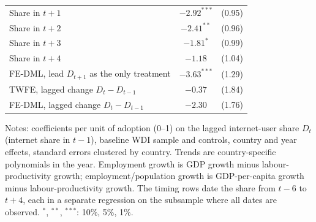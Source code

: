 \documentclass[preprint,12pt,authoryear]{elsarticle}
\begin{document}
\begin{table}[!ht]
\begin{threeparttable}
\begin{tabular}{lcc}
\quad Share in $t+1$ & $-2.92^{***}$ & (0.95)\\
\quad Share in $t+2$ & $-2.41^{**}$ & (0.96)\\
\quad Share in $t+3$ & $-1.81^{*}$ & (0.99)\\
\quad Share in $t+4$ & $-1.18$ & (1.04)\\
\addlinespace
FE-DML, lead $D_{t+1}$ as the only treatment & $-3.63^{***}$ & (1.29)\\
TWFE, lagged change $D_t-D_{t-1}$ & $-0.37$ & (1.84)\\
FE-DML, lagged change $D_t-D_{t-1}$ & $-2.30$ & (1.76)\\
\bottomrule
\end{tabular}
\begin{tablenotes}\scriptsize
\item Notes: coefficients per unit of adoption (0--1) on the lagged internet-user share $D_t$ (internet share in $t-1$), baseline WDI sample and controls, country and year effects, standard errors clustered by country. Trends are country-specific polynomials in the year. Employment growth is GDP growth minus labour-productivity growth; employment/population growth is GDP-per-capita growth minus labour-productivity growth. The timing rows date the share from $t-6$ to $t+4$, each in a separate regression on the subsample where all dates are observed. $^{*}$, $^{**}$, $^{***}$: 10\%, 5\%, 1\%.
\end{tablenotes}
\end{threeparttable}
\end{table}
\end{document}
